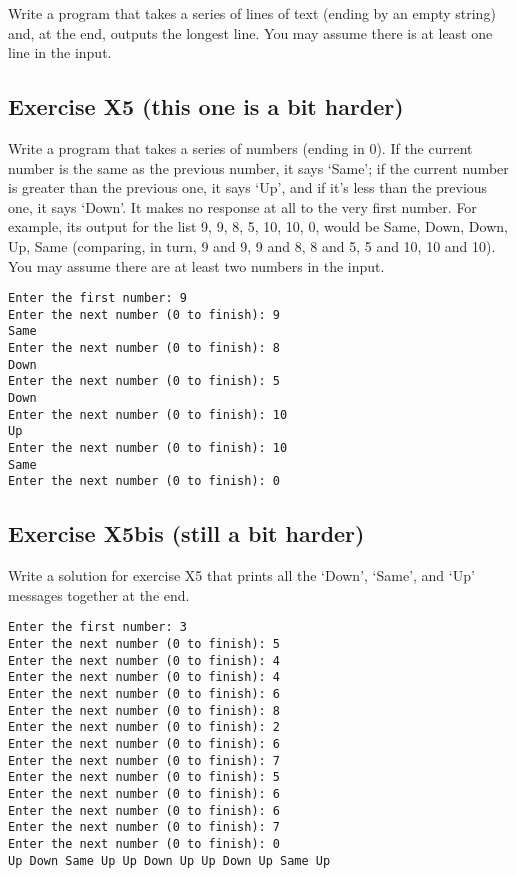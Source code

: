Write a program that takes a series of lines of text (ending by 
an empty string) and,
at the end, outputs the longest line.
You may assume there is at least one line in the input.

\pagebreak


\subsection*{Exercise X5 (this one is a bit harder)}

Write a program that takes
a series of numbers (ending in 0).  If the
current number is the same as the previous number, it says `Same';
if the current number is greater than the previous one, it says `Up',
and if it's less than the previous one, it says `Down'.
It makes no response at all to the
very first number.  For example, its output for the list 9, 9, 8, 5,
10, 10, 0,
would be Same, Down, Down, Up, Same
(comparing, in turn, 9 and 9, 9 and 8, 8 and 5, 5 and 10, 10 and 10).
You may assume there are at least two numbers in the input.

\begin{verbatim}
Enter the first number: 9
Enter the next number (0 to finish): 9
Same
Enter the next number (0 to finish): 8
Down
Enter the next number (0 to finish): 5
Down
Enter the next number (0 to finish): 10
Up
Enter the next number (0 to finish): 10
Same
Enter the next number (0 to finish): 0
\end{verbatim}

\subsection*{Exercise X5bis (still a bit harder)}

Write a solution for exercise X5 that prints all the `Down',
`Same', and `Up' messages together at the end. 

\begin{verbatim}
Enter the first number: 3
Enter the next number (0 to finish): 5
Enter the next number (0 to finish): 4
Enter the next number (0 to finish): 4
Enter the next number (0 to finish): 6
Enter the next number (0 to finish): 8
Enter the next number (0 to finish): 2
Enter the next number (0 to finish): 6
Enter the next number (0 to finish): 7
Enter the next number (0 to finish): 5
Enter the next number (0 to finish): 6
Enter the next number (0 to finish): 6
Enter the next number (0 to finish): 7
Enter the next number (0 to finish): 0
Up Down Same Up Up Down Up Up Down Up Same Up 
\end{verbatim}


